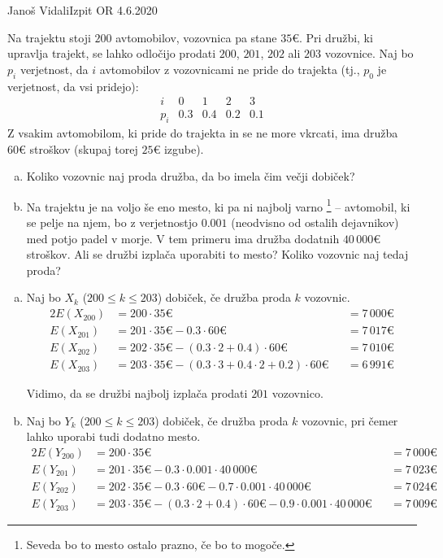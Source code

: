 \begin{naloga}{Janoš Vidali}{Izpit OR 4.6.2020}
\begin{vprasanje}
Na trajektu stoji $200$ avtomobilov, vozovnica pa stane $35 €$.
Pri družbi, ki upravlja trajekt,
se lahko odločijo prodati $200$, $201$, $202$ ali $203$ vozovnice.
Naj bo $p_i$ ve\-rjet\-nost,
da $i$ avtomobilov z vozovnicami ne pride do trajekta
(tj., $p_0$ je verjetnost, da vsi pridejo):
$$
\begin{array}{c|cccc}
i & 0 & 1 & 2 & 3 \\ \hline
p_i & 0.3 & 0.4 & 0.2 & 0.1
\end{array}
$$
Z vsakim avtomobilom, ki pride do trajekta in se ne more vkrcati,
ima družba $60 €$ stroškov (skupaj torej $25 €$ izgube).

\begin{enumerate}[(a)]
\item Koliko vozovnic naj proda družba, da bo imela čim večji dobiček?
\item Na trajektu je na voljo še eno mesto, ki pa ni najbolj varno%
\footnote{Seveda bo to mesto ostalo prazno, če bo to mogoče.}
-- avtomobil, ki se pelje na njem,
bo z verjetnostjo $0.001$
(neodvisno od ostalih dejavnikov)
med potjo padel v morje.
V tem primeru ima družba dodatnih $40\,000 €$ stroškov.
Ali se družbi izplača uporabiti to mesto?
Koliko vozovnic naj tedaj proda?
\end{enumerate}
\end{vprasanje}

\begin{odgovor}
\begin{enumerate}[(a)]
\item Naj bo $X_k$ ($200 \le k \le 203$) dobiček,
če družba proda $k$ vozovnic.
\begin{alignat*}{2}
E(X_{200}) &= 200 \cdot 35 € &&= 7\,000 € \\
E(X_{201}) &= 201 \cdot 35 € - 0.3 \cdot 60 € &&= 7\,017 € \\
E(X_{202}) &= 202 \cdot 35 € - (0.3 \cdot 2 + 0.4) \cdot 60 € &&= 7\,010 € \\
E(X_{203}) &= 203 \cdot 35 € - (0.3 \cdot 3 + 0.4 \cdot 2 + 0.2) \cdot 60 € &&= 6\,991 €
\end{alignat*}

Vidimo, da se družbi najbolj izplača prodati $201$ vozovnico.

\item Naj bo $Y_k$ ($200 \le k \le 203$) dobiček,
če družba proda $k$ vozovnic, pri čemer lahko uporabi tudi dodatno mesto.
\begin{alignat*}{2}
E(Y_{200}) &= 200 \cdot 35 € &&= 7\,000 € \\
E(Y_{201}) &= 201 \cdot 35 € - 0.3 \cdot 0.001 \cdot 40\,000 € &&= 7\,023 € \\
E(Y_{202}) &= 202 \cdot 35 € - 0.3 \cdot 60 € - 0.7 \cdot 0.001 \cdot 40\,000 € &&= 7\,024 € \\
E(Y_{203}) &= 203 \cdot 35 € - (0.3 \cdot 2 + 0.4) \cdot 60 € - 0.9 \cdot 0.001 \cdot 40\,000 € &&= 7\,009 €
\end{alignat*}


\end{enumerate}
\end{odgovor}
\end{naloga}
